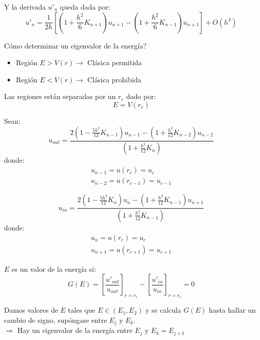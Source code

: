 \begin{frame}{}

Y la derivada $u'_{n}$ queda dada por:
\begin{equation*}
    u'_{n} = \frac{1}{2h} \left[\left(1+\frac{h^{2}}{6}K_{n+1}\right)u_{n+1} - \left(1+\frac{h^{2}}{6}K_{n-1}\right)u_{n+1}\right] + O(h^{4})
\end{equation*}

Cómo determinar un eigenvalor de la energía?
\begin{itemize}
    \item Región $E>V(r) \rightarrow$ Clásica permitida
    \item Región $E<V(r) \rightarrow$ Clásica prohibida
\end{itemize}
\vspace{5mm}
Las regiones están separadas por un $r_{c}$ dado por:
\begin{equation*}
    E=V(r_{c})
\end{equation*}
    
\end{frame}

\begin{frame}

Sean:
\begin{equation*}
    u_{out} = \frac{2\left(1-\frac{5h^{2}}{12}K_{n-1}\right)u_{n-1} - \left(1+\frac{h^{2}}{12}K_{n-2}\right)u_{n-2}}{\left(1+\frac{h^{2}}{12}K_{n}\right)}
\end{equation*}
donde:
\begin{gather*}
    u_{n-1} = u(r_{c}) = u_{c} \\
    u_{n-2} = u(r_{c-1}) = u_{c-1}
\end{gather*}

\begin{equation*}
    u_{in} = \frac{2\left(1-\frac{5h^{2}}{12}K_{n}\right)u_{n} - \left(1+\frac{h^{2}}{12}K_{n-1}\right)u_{n+1}}{\left(1+\frac{h^{2}}{12}K_{n-1}\right)}
\end{equation*}
donde:
\begin{gather*}
    u_{n} = u(r_{c}) = u_{c} \\
    u_{n+1} = u(r_{c+1}) = u_{c+1}
\end{gather*}
    
\end{frame}

\begin{frame}{}

$E$ es un valor de la energía si:
\begin{equation*}
    G(E) = \left[\frac{u'_{out}}{u_{out}}\right]_{r=r_{c}} - \left[\frac{u'_{in}}{u_{in}}\right]_{r=r_{c}} = 0
\end{equation*}

Damos valores de $E$ tales que $E\in(E_{1},E_{2})$ y se calcula $G(E)$ hasta hallar un cambio de signo, supóngase entre $E_{j}$ y $E_{k}$.\\
\vspace{5mm}
$\Rightarrow$ Hay un eigenvalor de la energía entre $E_{j}$ y $E_{k}=E_{j+1}$
    
\end{frame}

